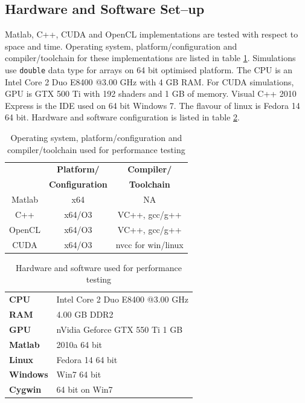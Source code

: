 \documentclass{article}
\begin{document}
\subsection{Hardware and Software Set--up}
Matlab, C++, CUDA and OpenCL implementations are tested with respect to space and time. Operating system, platform/configuration and compiler/toolchain for these implementations are listed in table \ref{Tab:OS-Platform/Configuration-Compiler/Toolchain-for-Testing}. Simulations use \verb|double| data type for arrays on 64 bit optimised platform. The CPU is an Intel Core 2 Duo E8400 @3.00 GHz with 4 GB RAM. For CUDA simulations, GPU is GTX 500 Ti with 192 shaders and 1 GB of memory. Visual C++ 2010 Express is the IDE used on 64 bit Windows 7. The flavour of linux is Fedora 14 64 bit. Hardware and software configuration is listed in table \ref{Tab:Hardware-Software-Configuration-for-Testing}.
\begin{table}[t!]
\begin{center}
\vspace{0.3cm}
	\begin{tabular}{ccc}
	\hline \hline
		\rule{0pt}{2.6ex} & \textbf{Platform/} & \textbf{Compiler/}\\
		& \textbf{Configuration} & \textbf{Toolchain}\\
		\hline
		Matlab \rule{0pt}{2.6ex} & x64 & NA\\
		C++ & x64/O3 & VC++, gcc/g++\\
		OpenCL & x64/O3 & VC++, gcc/g++\\
		CUDA & x64/O3 & nvcc for win/linux\\
	\hline \hline
	\end{tabular}
\end{center}
\caption{Operating system, platform/configuration and compiler/toolchain used for performance testing}
\label{Tab:OS-Platform/Configuration-Compiler/Toolchain-for-Testing}
\end{table}
\begin{table}[t!]
\begin{center}
\vspace{0.3cm}
	\begin{tabular}{ll}
	\hline \hline
		\textbf{CPU} \rule{0pt}{2.6ex}& Intel Core 2 Duo E8400 @3.00 GHz\\
		\textbf{RAM} & 4.00 GB DDR2\\
		\textbf{GPU} & nVidia Geforce GTX 550 Ti 1 GB\\
		\textbf{Matlab} & 2010a 64 bit\\
		\textbf{Linux} & Fedora 14 64 bit\\
		\textbf{Windows} & Win7 64 bit\\
		\textbf{Cygwin} & 64 bit on Win7\\
	\hline \hline
	\end{tabular}
\end{center}
\caption{Hardware and software used for performance testing}
\label{Tab:Hardware-Software-Configuration-for-Testing}
\end{table}
\end{document}
